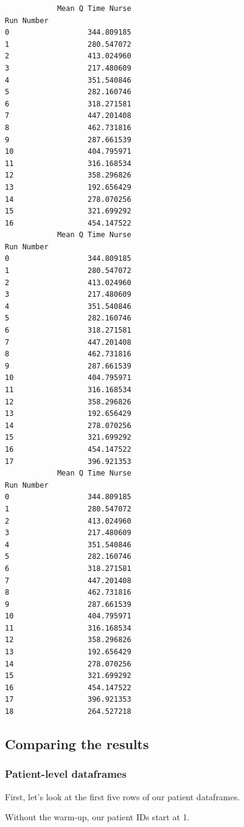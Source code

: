 \documentclass[
  letterpaper,
  DIV=11,
  numbers=noendperiod]{scrreprt}
\begin{document}
\begin{verbatim}
            Mean Q Time Nurse
Run Number                   
0                  344.809185
1                  280.547072
2                  413.024960
3                  217.480609
4                  351.540846
5                  282.160746
6                  318.271581
7                  447.201408
8                  462.731816
9                  287.661539
10                 404.795971
11                 316.168534
12                 358.296826
13                 192.656429
14                 278.070256
15                 321.699292
16                 454.147522
            Mean Q Time Nurse
Run Number                   
0                  344.809185
1                  280.547072
2                  413.024960
3                  217.480609
4                  351.540846
5                  282.160746
6                  318.271581
7                  447.201408
8                  462.731816
9                  287.661539
10                 404.795971
11                 316.168534
12                 358.296826
13                 192.656429
14                 278.070256
15                 321.699292
16                 454.147522
17                 396.921353
            Mean Q Time Nurse
Run Number                   
0                  344.809185
1                  280.547072
2                  413.024960
3                  217.480609
4                  351.540846
5                  282.160746
6                  318.271581
7                  447.201408
8                  462.731816
9                  287.661539
10                 404.795971
11                 316.168534
12                 358.296826
13                 192.656429
14                 278.070256
15                 321.699292
16                 454.147522
17                 396.921353
18                 264.527218
\end{verbatim}

\subsection{Comparing the results}\label{comparing-the-results}

\subsubsection{Patient-level dataframes}\label{patient-level-dataframes}

First, let's look at the first five rows of our patient dataframes.

Without the warm-up, our patient IDs start at 1.
\end{document}
